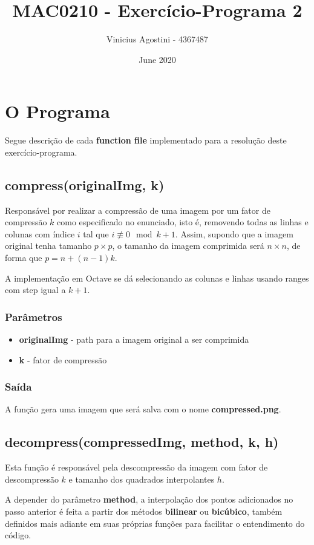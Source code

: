 \documentclass[leqno]{article}
\title{MAC0210 - Exercício-Programa 2}
\author{Vinicius Agostini - 4367487}
\date{June 2020}
\begin{document}
\maketitle

\section{O Programa}
Segue descrição de cada \textbf{function file} implementado para a
resolução deste exercício-programa.

\subsection{compress(originalImg, k)}
Responsável por realizar a compressão de uma imagem por um fator de compressão
$k$ como especificado no enunciado, isto é, removendo todas as linhas e colunas
com índice $i$ tal que $i \not\equiv 0 \mod k+1$. Assim, supondo que a imagem
original tenha tamanho $p \times p$, o tamanho da imagem comprimida será
$n \times n$, de forma que $p = n + (n-1)k$.

A implementação em Octave se dá selecionando as colunas e linhas usando ranges
com step igual a $k+1$.

\subsubsection{Parâmetros}
\begin{itemize}
    \item \textbf{originalImg} - path para a imagem original a ser comprimida
    \item \textbf{k} - fator de compressão
\end{itemize}

\subsubsection{Saída}
A função gera uma imagem que será salva com o nome \textbf{compressed.png}.

\subsection{decompress(compressedImg, method, k, h)}
Esta função é responsável pela descompressão da imagem com fator de descompressão
$k$ e tamanho dos quadrados interpolantes $h$.

A depender do parâmetro \textbf{method}, a interpolação dos pontos
adicionados no passo anterior é feita a partir dos métodos \textbf{bilinear} ou
\textbf{bicúbico}, também definidos mais adiante em suas próprias funções para
facilitar o entendimento do código.
\end{document}
